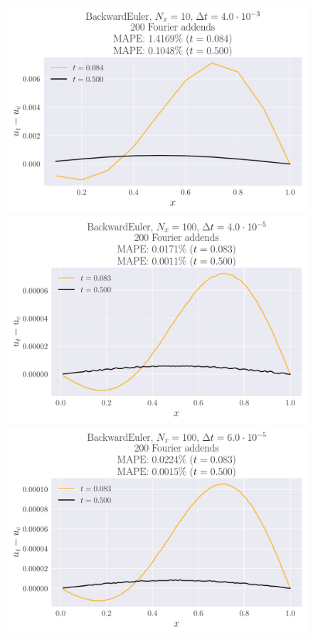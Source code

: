 \documentclass[reprint, english,notitlepage,nofootinbib]{revtex4-1}  %
\begin{document}
\begin{figure}
  \includegraphics[width=\linewidth]{BackwardEuler-Nt125-dt4_0e-03-Nx10-Error.pdf}
  \includegraphics[width=\linewidth]{BackwardEuler-Nt12499-dt4_0e-05-Nx100-Error.pdf}
  \includegraphics[width=\linewidth]{BackwardEuler-Nt8333-dt6_0e-05-Nx100-Error.pdf}

\end{figure}
\end{document}
